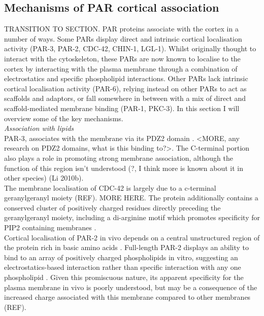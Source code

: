 \documentclass[12pt]{"report"}
\begin{document}
\subsection{Mechanisms of PAR cortical association}

TRANSITION TO SECTION. PAR proteins associate with the cortex in a number of ways. Some PARs display direct and intrinsic cortical localisation activity (PAR-3, PAR-2, CDC-42, CHIN-1, LGL-1). Whilst originally thought to interact with the cytoskeleton, these PARs are now known to localise to the cortex by interacting with the plasma membrane through a combination of electrostatics and specific phospholipid interactions. Other PARs lack intrinsic cortical localisation activity (PAR-6), relying instead on other PARs to act as scaffolds and adaptors, or fall somewhere in between with a mix of direct and scaffold-mediated membrane binding (PAR-1, PKC-3). In this section I will overview some of the key mechanisms.\\


\textit{Association with lipids}\\


PAR-3, associates with the membrane via its PDZ2 domain \parencite{Li2010a}. <MORE, any research on PDZ2 domains, what is this binding to?>.  The C-terminal portion also plays a role in promoting strong membrane association, although the function of this region isn’t understood (?, I think more is known about it in other species) (Li 2010b). \\


The membrane localisation of CDC-42 is largely due to a c-terminal geranylgeranyl moiety (REF). MORE HERE. The protein additionally contains a conserved cluster of positively charged residues directly preceding the geranylgeranyl moiety, including a di-arginine motif which promotes specificity for PIP2 containing membranes \parencite{Johnson2012}.\\

Cortical localisation of PAR-2 in vivo depends on a central unstructured region of the protein rich in basic amino acids \parencite{Hao2006}. Full-length PAR-2 displays an ability to bind to an array of positively charged phospholipids in vitro, suggesting an electrostatics-based interaction rather than specific interaction with any one phospholipid \parencite{Motegi2011}. Given this promiscuous nature, its apparent specificity for the plasma membrane in vivo is poorly understood, but may be a consequence of the increased charge associated with this membrane compared to other membranes (REF).\\
\end{document}
